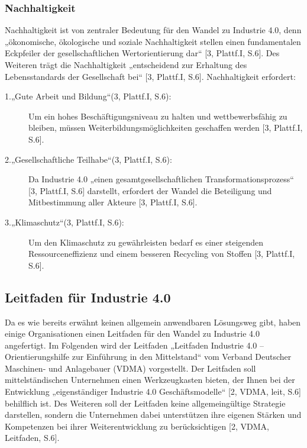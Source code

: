 \subsubsection{Nachhaltigkeit}\label{sec:Nachhaltigkeit}
Nachhaltigkeit ist von zentraler Bedeutung für den Wandel zu Industrie 4.0, denn „ökonomische, ökologische und soziale Nachhaltigkeit stellen einen fundamentalen Eckpfeiler der gesellschaftlichen Wertorientierung dar“ [3, Plattf.I, S.6]. Des Weiteren trägt die Nachhaltigkeit „entscheidend zur Erhaltung des Lebensstandards der Gesellschaft bei“ [3, Plattf.I, S.6]. Nachhaltigkeit erfordert:
\begin{description}
	\item[1.„Gute Arbeit und Bildung“(3, Plattf.I, S.6):]
	
	Um ein hohes Beschäftigungsniveau zu halten und wettbewerbsfähig zu bleiben, müssen
	Weiterbildungsmöglichkeiten geschaffen werden [3, Plattf.I, S.6].
		
	\item[2.„Gesellschaftliche Teilhabe“(3, Plattf.I, S.6):]
	
	Da Industrie 4.0 „einen gesamtgesellschaftlichen Transformationsprozess“ [3, Plattf.I, S.6]
	darstellt, erfordert der Wandel die Beteiligung und Mitbestimmung aller Akteure [3, Plattf.I, 
	S.6].
		
	\item[3.„Klimaschutz“(3, Plattf.I, S.6):]
	
	Um den Klimaschutz zu gewährleisten bedarf es einer steigenden Ressourceneffizienz
	und einem besseren Recycling von Stoffen [3, Plattf.I, S.6].
	\end{description}

\subsection{Leitfaden für Industrie 4.0}\label{sec:LeitfadenUmsetung}

Da es wie bereits erwähnt keinen allgemein anwendbaren Lösungsweg gibt, haben einige Organisationen einen Leitfaden für den Wandel zu Industrie 4.0 angefertigt. Im Folgenden wird der Leitfaden „Leitfaden Industrie 4.0 – Orientierungshilfe zur Einführung in den Mittelstand“ vom Verband Deutscher Maschinen- und Anlagebauer (VDMA) vorgestellt.
\newline
Der Leitfaden soll mittelständischen Unternehmen einen Werkzeugkasten bieten, der Ihnen bei der Entwicklung „eigenständiger Industrie 4.0 Geschäftsmodelle“ [2, VDMA, leit, S.6] behilflich ist. Des Weiteren soll der Leitfaden keine allgemeingültige Strategie darstellen, sondern die Unternehmen dabei unterstützen ihre eigenen Stärken und Kompetenzen bei ihrer Weiterentwicklung zu berücksichtigen [2, VDMA, Leitfaden, S.6].

